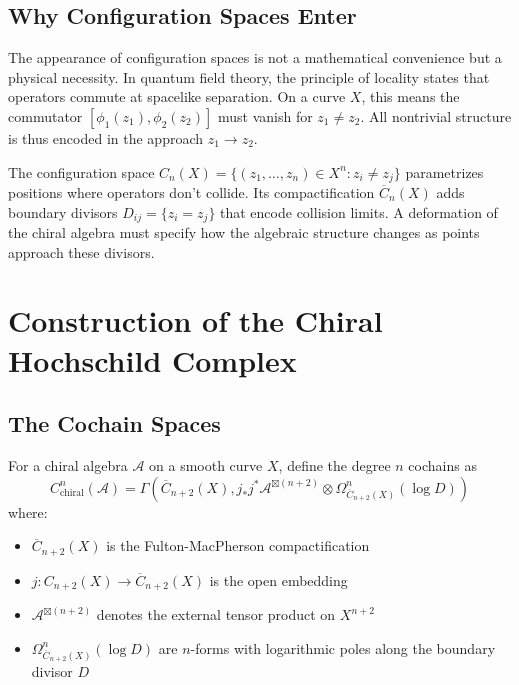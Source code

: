 \subsection{Why Configuration Spaces Enter}

The appearance of configuration spaces is not a mathematical convenience but a physical necessity. In quantum field theory, the principle of locality states that operators commute at spacelike separation. On a curve $X$, this means the commutator $[\phi_1(z_1), \phi_2(z_2)]$ must vanish for $z_1 \neq z_2$. All nontrivial structure is thus encoded in the approach $z_1 \to z_2$.

The configuration space $C_n(X) = \{(z_1,\ldots,z_n) \in X^n : z_i \neq z_j\}$ parametrizes positions where operators don't collide. Its compactification $\overline{C}_n(X)$ adds boundary divisors $D_{ij} = \{z_i = z_j\}$ that encode collision limits. A deformation of the chiral algebra must specify how the algebraic structure changes as points approach these divisors.

\section{Construction of the Chiral Hochschild Complex}

\subsection{The Cochain Spaces}

\begin{definition}
For a chiral algebra $\mathcal{A}$ on a smooth curve $X$, define the degree $n$ cochains as
\[
C^n_{\text{chiral}}(\mathcal{A}) = \Gamma\left(\overline{C}_{n+2}(X), j_*j^*\mathcal{A}^{\boxtimes (n+2)} \otimes \Omega^n_{\overline{C}_{n+2}(X)}(\log D)\right)
\]
where:
\begin{itemize}
\item $\overline{C}_{n+2}(X)$ is the Fulton-MacPherson compactification
\item $j: C_{n+2}(X) \to \overline{C}_{n+2}(X)$ is the open embedding
\item $\mathcal{A}^{\boxtimes (n+2)}$ denotes the external tensor product on $X^{n+2}$
\item $\Omega^n_{\overline{C}_{n+2}(X)}(\log D)$ are $n$-forms with logarithmic poles along the boundary divisor $D$
\end{itemize}
\end{definition}

